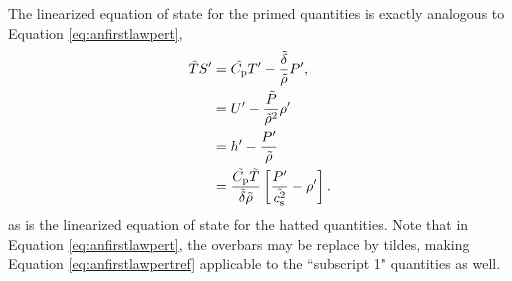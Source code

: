 \documentclass[12pt]{article}
\newcommand{\vecf}{\bm{F}}
\begin{document}
The linearized equation of state for the primed quantities is exactly analogous to Equation \eqref{eq:anfirstlawpert},
\begin{subequations}\label{eq:anfirstlawpertref}
	\begin{align}
		\tilde{T} S^\prime &= \tilde{C_{\rm{p}}} T^\prime - \frac{\tilde{\delta}}{\tilde{\rho}} P^\prime,\\
  	&= U^\prime - \frac{\tilde{P}}{\tilde{\rho}^2}\rho^\prime \label{eq:linuref}\\
&= h^\prime - \frac{P^\prime}{\tilde{\rho}}\\
		&= \frac{\tilde{C_{\rm{p}}} \tilde{T}}{\tilde{\delta}\tilde{\rho}}\left[\frac{P^\prime}{\tilde{c_{\rm s}^2}}-\rho^\prime\right].
	\end{align}
\end{subequations}
as is the linearized equation of state for the hatted quantities. Note that in Equation \eqref{eq:anfirstlawpert}, the overbars may be replace by tildes, making Equation \eqref{eq:anfirstlawpertref} applicable to the ``subscript 1" quantities as well. 
\end{document}
